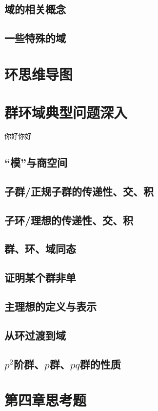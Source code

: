 \documentclass[zihao=-4,UTF8]{report}
\begin{document}
\subsection{域的相关概念}
\subsection{一些特殊的域}

\section{环思维导图}

\section{群环域典型问题深入}
你好你好
\subsection{“模”与商空间}
\subsection{子群/正规子群的传递性、交、积}
\subsection{子环/理想的传递性、交、积}
\subsection{群、环、域同态}
\subsection{证明某个群非单}
\subsection{主理想的定义与表示}
\subsection{从环过渡到域}
\subsection{$p^2$阶群、$p$群、$pq$群的性质}

\section{第四章思考题}
\end{document}
